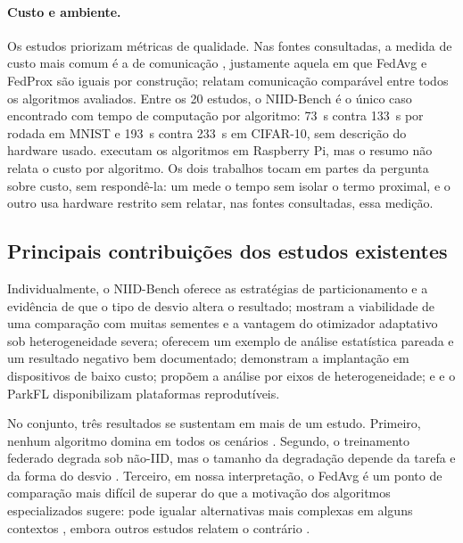 \paragraph{Custo e ambiente.}
Os estudos priorizam métricas de qualidade. Nas fontes consultadas, a medida de custo mais comum é a de comunicação \citep{bakr2026parkfl, tan2026instruction, mim2025healthcare}, justamente aquela em que FedAvg e FedProx são iguais por construção; \citet{tan2026instruction} relatam comunicação comparável entre todos os algoritmos avaliados. Entre os 20 estudos, o NIID-Bench é o único caso encontrado com tempo de computação por algoritmo: 73~s contra 133~s por rodada em MNIST e 193~s contra 233~s em CIFAR-10, sem descrição do hardware usado. \citet{carranco2025adhoc} executam os algoritmos em Raspberry Pi, mas o resumo não relata o custo por algoritmo. Os dois trabalhos tocam em partes da pergunta sobre custo, sem respondê-la: um mede o tempo sem isolar o termo proximal, e o outro usa hardware restrito sem relatar, nas fontes consultadas, essa medição.

\subsection{Principais contribuições dos estudos existentes}

Individualmente, o NIID-Bench oferece as estratégias de particionamento e a evidência de que o tipo de desvio altera o resultado; \citet{enang2026optimiser} mostram a viabilidade de uma comparação com muitas sementes e a vantagem do otimizador adaptativo sob heterogeneidade severa; \citet{quintana2026mammography} oferecem um exemplo de análise estatística pareada e um resultado negativo bem documentado; \citet{carranco2025adhoc} demonstram a implantação em dispositivos de baixo custo; \citet{ghosh2026renewable} propõem a análise por eixos de heterogeneidade; e \citet{marella2025fedonco} e o ParkFL \citep{bakr2026parkfl} disponibilizam plataformas reprodutíveis.

No conjunto, três resultados se sustentam em mais de um estudo. Primeiro, nenhum algoritmo domina em todos os cenários \citep{li2022niidbench, onlu2025aggregation, mim2025healthcare}. Segundo, o treinamento federado degrada sob não-IID, mas o tamanho da degradação depende da tarefa e da forma do desvio \citep{li2022niidbench, sevinc2025distribution, hu2025uav, ghosh2026renewable}. Terceiro, em nossa interpretação, o FedAvg é um ponto de comparação mais difícil de superar do que a motivação dos algoritmos especializados sugere: pode igualar alternativas mais complexas em alguns contextos \citep{li2022niidbench, quintana2026mammography, marella2025fedonco}, embora outros estudos relatem o contrário \citep{mahmood2025alzheimer, delehouzee2024crosssilo, julekha2026bangla}.

